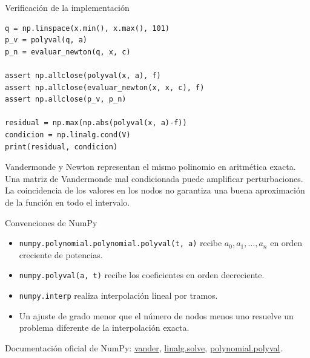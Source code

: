 \documentclass[aspectratio=169,12pt]{beamer}
\theoremstyle{remark}
\begin{document}
\begin{frame}[fragile]{Verificación de la implementación}
\begin{lstlisting}
q = np.linspace(x.min(), x.max(), 101)
p_v = polyval(q, a)
p_n = evaluar_newton(q, x, c)

assert np.allclose(polyval(x, a), f)
assert np.allclose(evaluar_newton(x, x, c), f)
assert np.allclose(p_v, p_n)

residual = np.max(np.abs(polyval(x, a)-f))
condicion = np.linalg.cond(V)
print(residual, condicion)
\end{lstlisting}
Vandermonde y Newton representan el mismo polinomio en aritmética exacta.
Una matriz de Vandermonde mal condicionada puede amplificar perturbaciones.
La coincidencia de los valores en los nodos no garantiza una buena
aproximación de la función en todo el intervalo.
\end{frame}

\begin{frame}{Convenciones de NumPy}
\begin{itemize}
\item \texttt{numpy.polynomial.polynomial.polyval(t, a)} recibe
$a_0,a_1,\dots,a_n$ en orden creciente de potencias.
\item \texttt{numpy.polyval(a, t)} recibe los coeficientes en orden decreciente.
\item \texttt{numpy.interp} realiza interpolación lineal por tramos.
\item Un ajuste de grado menor que el número de nodos menos uno
resuelve un problema diferente de la interpolación exacta.
\end{itemize}
\vfill
{\scriptsize Documentación oficial de NumPy:
\href{https://numpy.org/doc/stable/reference/generated/numpy.vander.html}{vander},
\href{https://numpy.org/doc/stable/reference/generated/numpy.linalg.solve.html}{linalg.solve},
\href{https://numpy.org/doc/stable/reference/generated/numpy.polynomial.polynomial.polyval.html}{polynomial.polyval}.}
\end{frame}
\end{document}
